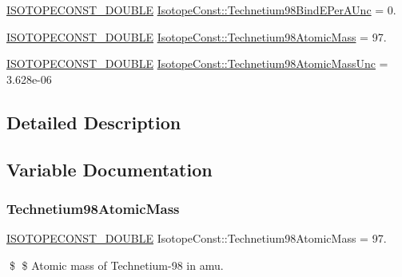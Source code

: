 \begin{DoxyCompactItemize}
\mbox{\hyperlink{group___isotope_const-_macros_ga8f45a7272ce02c0b4c65c44636ed719a}{I\+S\+O\+T\+O\+P\+E\+C\+O\+N\+S\+T\+\_\+\+D\+O\+U\+B\+LE}} \mbox{\hyperlink{group___isotope_const-_technetium-_tc98_ga5a9efd0581f948d4e450083a3b141a7e}{Isotope\+Const\+::\+Technetium98\+Bind\+E\+Per\+A\+Unc}} = 0.
\item 
\mbox{\hyperlink{group___isotope_const-_macros_ga8f45a7272ce02c0b4c65c44636ed719a}{I\+S\+O\+T\+O\+P\+E\+C\+O\+N\+S\+T\+\_\+\+D\+O\+U\+B\+LE}} \mbox{\hyperlink{group___isotope_const-_technetium-_tc98_ga027ecdb1ed4d4c7bdc69645aa29e0f41}{Isotope\+Const\+::\+Technetium98\+Atomic\+Mass}} = 97.
\item 
\mbox{\hyperlink{group___isotope_const-_macros_ga8f45a7272ce02c0b4c65c44636ed719a}{I\+S\+O\+T\+O\+P\+E\+C\+O\+N\+S\+T\+\_\+\+D\+O\+U\+B\+LE}} \mbox{\hyperlink{group___isotope_const-_technetium-_tc98_ga8be130ab0f08b9c33837c0cd970fb832}{Isotope\+Const\+::\+Technetium98\+Atomic\+Mass\+Unc}} = 3.\+628e-\/06
\end{DoxyCompactItemize}


\subsection{Detailed Description}


\subsection{Variable Documentation}
\mbox{\label{group___isotope_const-_technetium-_tc98_ga027ecdb1ed4d4c7bdc69645aa29e0f41}} 
\subsubsection{\texorpdfstring{Technetium98\+Atomic\+Mass}{Technetium98AtomicMass}}
{\footnotesize\ttfamily \mbox{\hyperlink{group___isotope_const-_macros_ga8f45a7272ce02c0b4c65c44636ed719a}{I\+S\+O\+T\+O\+P\+E\+C\+O\+N\+S\+T\+\_\+\+D\+O\+U\+B\+LE}} Isotope\+Const\+::\+Technetium98\+Atomic\+Mass = 97.}

\$ \$ Atomic mass of Technetium-\/98 in amu. \mbox{\label{group___isotope_const-_technetium-_tc98_ga8be130ab0f08b9c33837c0cd970fb832}} 
